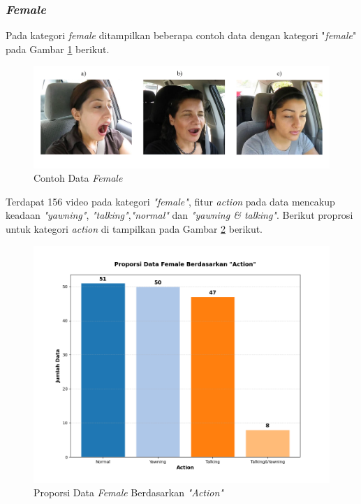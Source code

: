 \begin{table}[H]
\subsubsection{\textit{Female}}

    
    Pada kategori \textit{female} ditampilkan beberapa contoh data dengan kategori "\textit{female}" pada Gambar \ref{Female Dataset} berikut.
    
     \begin{figure}[H]
         \centering
         \includegraphics[width=1.0\linewidth]{figures/bab4/female_contoh.png}
         \caption{Contoh Data \textit{Female}}
         \label{Female Dataset}
     \end{figure}

   

     Terdapat 156 video pada kategori \textit{"female"}, fitur \textit{action} pada data mencakup keadaan \textit{"yawning"}, \textit{"talking"},\textit{"normal"} dan \textit{"yawning \& talking"}. Berikut proprosi untuk kategori \textit{action} di tampilkan pada Gambar \ref{Proporsi Data Female Berdasarkan "Action"} berikut.

     \begin{figure}[H]
         \centering
         \includegraphics[width=0.75\linewidth]{figures/bab4/data_female.png}
         \caption{Proporsi Data \textit{Female }Berdasarkan \textit{"Action"}}
         \label{Proporsi Data Female Berdasarkan "Action"}
     \end{figure}


\end{table}
